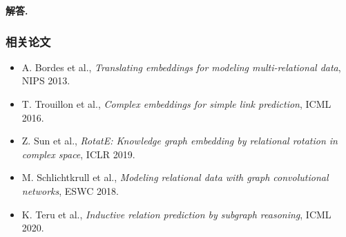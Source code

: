 \documentclass[12pt, a4paper, oneside]{ctexart}
\numberwithin{equation}{section}  %
\newenvironment{solution}[1][]{\par\noindent\textbf{#1解答. }}{\smallskip\par}  %
\begin{document}
\begin{solution}
\subsubsection*{相关论文}
\begin{itemize}
  \item A. Bordes et al., \textit{Translating embeddings for modeling multi-relational data}, NIPS 2013.
  \item T. Trouillon et al., \textit{Complex embeddings for simple link prediction}, ICML 2016.
  \item Z. Sun et al., \textit{RotatE: Knowledge graph embedding by relational rotation in complex space}, ICLR 2019.
  \item M. Schlichtkrull et al., \textit{Modeling relational data with graph convolutional networks}, ESWC 2018.
  \item K. Teru et al., \textit{Inductive relation prediction by subgraph reasoning}, ICML 2020.
\end{itemize}
\end{solution}
\end{document}
